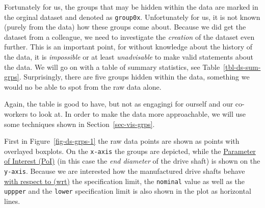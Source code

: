 \documentclass[
  a4paper,
]{scrbook}
\begin{document}
Fortunately for us, the groups that may be hidden within the data are
marked in the orginal dataset and denoted as \texttt{group0x}.
Unfortunately for us, it is not known (purely from the data) how these
groups come about. Because we did get the dataset from a colleague, we
need to investigate the \emph{creation} of the dataset even further.
This is an important point, for without knowledge about the history of
the data, it is \emph{impossible} or at least \emph{unadvisable} to make
valid statements about the data. We will go on with a table of summary
statistics, see Table~\ref{tbl-ds-sum-grps}. Surprisingly, there are
five groups hidden within the data, something we would no be able to
spot from the raw data alone.

\begin{table}

\caption{\label{tbl-ds-sum-grps}The group summary table of the drive
shaft data}


\end{table}%

Again, the table is good to have, but not as engagingi for ourself and
our co-workers to look at. In order to make the data more approachable,
we will use some techniques shown in Section~\ref{sec-vis-grps}.

First in Figure~\ref{fig-ds-grps-1} the raw data points are shown as
points with overlayed boxplots. On the \texttt{x-axis} the groups are
depicted, while the \hyperref[acronyms_PoI]{Parameter of Interest (PoI)}
(in this case the \emph{end diameter} of the drive shaft) is shown on
the \texttt{y-axis}. Because we are interested how the manufactured
drive shafts behave \hyperref[acronyms_wrt]{with respect to (wrt)} the
specification limit, the \texttt{nominal} value as well as the
\texttt{uppper} and the \texttt{lower} specification limit is also shown
in the plot as horizontal lines.
\end{document}
